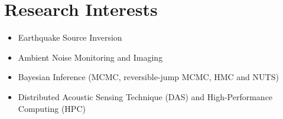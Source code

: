 \section{Research Interests}

\begin{itemize}
\item Earthquake Source Inversion
\item Ambient Noise Monitoring and Imaging
\item Bayesian Inference (MCMC, reversible-jump MCMC, HMC and NUTS)
\item Distributed Acoustic Sensing Technique (DAS) and High-Performance Computing (HPC)
\end{itemize}
